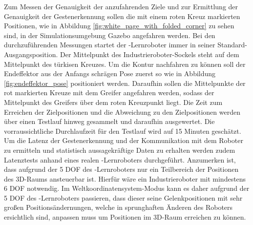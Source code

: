 Zum Messen der Genauigkeit der anzufahrenden Ziele und zur Ermittlung der Genauigkeit der Gestenerkennung sollen die mit einem roten Kreuz markierten Positionen, wie in Abbildung \ref{fig:white_page_with_folded_corner} zu sehen sind, in der Simulationsumgebung Gazebo angefahren werden. Bei den durchzuführenden Messungen startet der -Lernroboter immer in seiner Standard-Ausgangsposition. Der Mittelpunkt des Industrieroboter-Sockels steht auf dem Mittelpunkt des türkisen Kreuzes. Um die Kontur nachfahren zu können soll der Endeffektor aus der Anfangs schrägen Pose zuerst so wie in Abbildung \ref{fig:endeffektor_pose} positioniert werden. Daraufhin sollen die Mittelpunkte der rot markierten Kreuze mit dem Greifer angefahren werden, sodass der Mittelpunkt des Greifers über dem roten Kreuzpunkt liegt. Die Zeit zum Erreichen der Zielpositionen und die Abweichung zu den Zielpositionen werden über einen Testlauf hinweg gesammelt und daraufhin ausgewertet. Die vorraussichtliche Durchlaufzeit für den Testlauf wird auf 15 Minuten geschätzt. Um die Latenz der Gestenerkennung und der Kommunikation mit dem Roboter zu ermitteln und statistisch aussagekräftige Daten zu erhalten werden zudem Latenztests anhand eines realen -Lernroboters durchgeführt. Anzumerken ist, dass aufgrund der 5 DOF des -Lernroboters nur ein Teilbereich der Positionen des 3D-Raums ansteuerbar ist. Hierfür wäre ein Industrieroboter mit mindestens 6 DOF notwendig. Im Weltkoordinatensystem-Modus kann es daher aufgrund der 5 DOF des -Lernroboters passieren, dass dieser seine Gelenkpositionen mit sehr großen Positionsändernungen, welche in sprunghaften Änderen des Roboters ersichtlich sind, anpassen muss um Positionen im 3D-Raum erreichen zu können.
